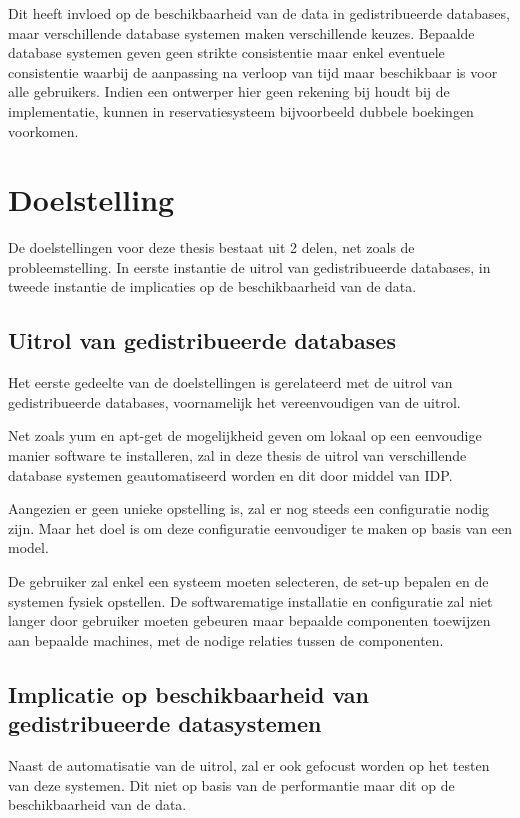 Dit heeft invloed op de beschikbaarheid van de data in gedistribueerde databases, maar verschillende database systemen maken verschillende keuzes. Bepaalde database systemen geven geen strikte consistentie maar enkel eventuele consistentie waarbij de aanpassing na verloop van tijd maar beschikbaar is voor alle gebruikers. Indien een ontwerper hier geen rekening bij houdt bij de implementatie, kunnen in reservatiesysteem bijvoorbeeld dubbele boekingen voorkomen. 

\section{Doelstelling}
De doelstellingen voor deze thesis bestaat uit 2 delen, net zoals de probleemstelling. In eerste instantie de uitrol van gedistribueerde databases, in tweede instantie de implicaties op de beschikbaarheid van de data. 

\subsection{Uitrol van gedistribueerde databases}
Het eerste gedeelte van de doelstellingen is gerelateerd met de uitrol van gedistribueerde databases, voornamelijk het vereenvoudigen van de uitrol. 

Net zoals \gls{yum} en \gls{apt-get} de mogelijkheid geven om lokaal op een eenvoudige manier software te installeren, zal in deze thesis de uitrol van verschillende database systemen geautomatiseerd worden en dit door middel van \gls{IDP}. 

Aangezien er geen unieke opstelling is, zal er nog steeds een configuratie nodig zijn. Maar het doel is om deze configuratie eenvoudiger te maken op basis van een model. 

De gebruiker zal enkel een systeem moeten selecteren, de set-up bepalen en de systemen fysiek opstellen. De softwarematige installatie en configuratie zal niet langer door gebruiker moeten gebeuren maar bepaalde componenten toewijzen aan bepaalde machines, met de nodige relaties tussen de componenten. 

\subsection{Implicatie op beschikbaarheid van gedistribueerde datasystemen} 
Naast de automatisatie van de uitrol, zal er ook gefocust worden op het testen van deze systemen. Dit niet op basis van de performantie maar dit op de beschikbaarheid van de data. 

